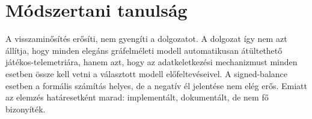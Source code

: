 \section{Módszertani tanulság}

A visszaminősítés erősíti, nem gyengíti a dolgozatot. A dolgozat így nem azt állítja, hogy minden elegáns gráfelméleti modell automatikusan átültethető játékos-telemetriára, hanem azt, hogy az adatkeletkezési mechanizmust minden esetben össze kell vetni a választott modell előfeltevéseivel. A signed-balance esetben a formális számítás helyes, de a negatív él jelentése nem elég erős. Emiatt az elemzés határesetként marad: implementált, dokumentált, de nem fő bizonyíték.
